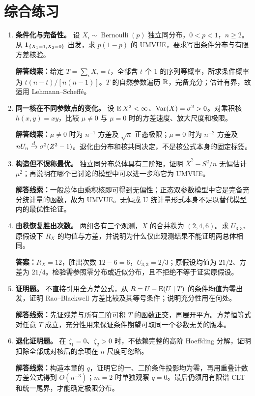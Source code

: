 \section{综合练习}

\begin{enumerate}
 \item \textbf{条件化与完备性。} 设 $X_i\sim\operatorname{Bernoulli}(p)$ 独立同分布，$0<p<1$，$n\geq2$。从 $\mathbf 1_{\{X_1=1,X_2=0\}}$ 出发，求 $p(1-p)$ 的 UMVUE，要求写出条件分布与有限方差核验。\par
 \textbf{解答线索：}给定 $T=\sum_iX_i=t$，全部含 $t$ 个 $1$ 的序列等概率，所求条件概率为 $t(n-t)/[n(n-1)]$。$T$ 的自然参数遍历 $\mathbb R$，完备充分；估计有界，故适用 Lehmann--Scheff\'e。

 \item \textbf{同一核在不同参数点的变化。} 设 $\operatorname{E} X^2<\infty$、$\operatorname{Var}(X)=\sigma^2>0$。对乘积核 $h(x,y)=xy$，比较 $\mu\neq0$ 与 $\mu=0$ 时的方差速度、放大尺度和极限。\par
 \textbf{解答线索：}$\mu\neq0$ 时为 $n^{-1}$ 方差及 $\sqrt n$ 正态极限；$\mu=0$ 时为 $n^{-2}$ 方差及 $nU_n\xrightarrow{d}\sigma^2(Z^2-1)$。退化由分布和核共同决定，不是核公式本身的固定标签。

 \item \textbf{构造但不误称最优。} 独立同分布总体具有二阶矩，证明 $\bar X^2-S^2/n$ 无偏估计 $\mu^2$；再说明在哪个已讨论的模型中可以进一步称它为 UMVUE。\par
 \textbf{解答线索：}一般总体由乘积核即可得到无偏性；正态双参数模型中它是完备充分统计量的函数，故为 UMVUE。无偏或 U 统计量形式本身不足以替代模型内的最优性论证。

 \item \textbf{由秩恢复胜出次数。} 两组各有三个观测，$X$ 的合并秩为 $(2,4,6)$。求 $U_{3,3}$、原假设下 $R_X$ 的均值与方差，并说明为什么仅此观测结果不能证明两总体相同。\par
 \textbf{答案：}$R_X=12$，胜出次数 $12-6=6$，$U_{3,3}=2/3$；原假设均值为 $21/2$、方差为 $21/4$。检验需参照零分布或近似分布，且不拒绝不等于证实原假设。

 \item \textbf{证明题。} 不直接引用全方差公式，从 $R=U-\operatorname{E}(U\mid T)$ 的条件均值为零出发，证明 Rao--Blackwell 方差比较及其等号条件；说明充分性用在何处。\par
 \textbf{解答线索：}先证残差与所有二阶可积 $T$ 的函数正交，再展开平方。方差恒等式对任意 $T$ 成立，充分性用来保证条件期望可取同一个参数无关的版本。

 \item \textbf{退化证明题。} 在 $\zeta_1=0$、$\zeta_2>0$ 时，不依赖完整的高阶 Hoeffding 分解，证明扣除全部成对核后的余项在 $n$ 尺度可忽略。\par
 \textbf{解答线索：}构造本章的 $q$，证明它的一、二阶条件投影均为零，再用重叠计数方差公式得到 $O(n^{-3})$；$m=2$ 时单独观察 $q=0$。最后仍须用有限谱 CLT 和统一尾界，才能确定极限分布。
\end{enumerate}
